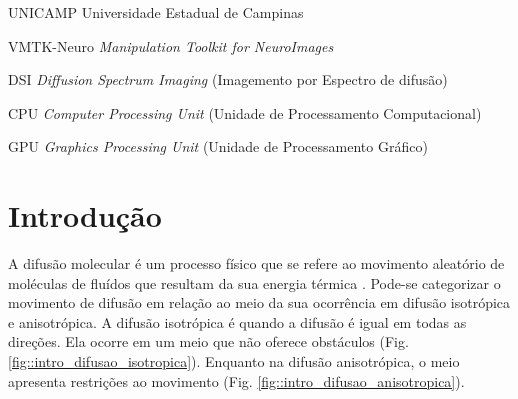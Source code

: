 \documentclass[
    12pt,                %
    oneside,            %
    a4paper,            %
    english,            %
    french,                %
    spanish,            %
    brazil                %
    ]{abntex2}
\begin{document}
\begin{siglas}
\item[UNICAMP] Universidade Estadual de Campinas



\item[VMTK-Neuro] \textit{Manipulation Toolkit for NeuroImages}

\item[DSI] \textit{Diffusion Spectrum Imaging} (Imagemento por Espectro de difusão)

\item [CPU] \textit{Computer Processing Unit} (Unidade de Processamento Computacional)

\item [GPU] \textit{Graphics Processing Unit} (Unidade de Processamento Gráfico)
\end{siglas}





\tableofcontents*
\cleardoublepage



\textual



\chapter{Introdução}
\label{sec:introducao}

A difusão molecular é um processo físico que se refere ao movimento aleatório de moléculas de fluídos que resultam da sua energia térmica \cite{lebihan2006}. 
Pode-se categorizar o movimento de difusão em relação ao meio da sua ocorrência em difusão isotrópica e anisotrópica. A difusão isotrópica é quando a difusão é igual em todas as direções. Ela ocorre em um meio que não oferece obstáculos (Fig. \ref{fig::intro_difusao_isotropica}). Enquanto na difusão anisotrópica, o meio apresenta restrições ao movimento (Fig. \ref{fig::intro_difusao_anisotropica}).
\end{document}
